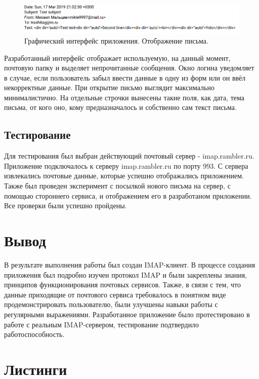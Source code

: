 \documentclass[a4paper,14pt]{extarticle}
\begin{document}
\begin{figure}[H]
	\begin{center}
		\includegraphics[scale=0.55]{pics/letter}
		\caption{Графический интерфейс приложения. Отображение письма.}
		\label{letter}
	\end{center}
\end{figure}

Разработанный интерфейс отображает используемую, на данный момент,
почтовую папку и выделяет непрочитанные сообщения.
Окно логина уведомляет в случае, если пользователь забыл ввести данные в одну из форм
или он ввёл некорректные данные. При открытие письмо выглядит максимально минималистично.
На отдельные строчки вынесены такие поля, как дата, тема письма, от кого оно, кому предназначалось и собственно сам текст письма.

\subsection{Тестирование}

Для тестирования был выбран действующий почтовый сервер - imap.rambler.ru. Приложение подключалось к серверу imap.rambler.ru по порту 993.
С сервера извлекались почтовые данные, которые успешно отображались приложением. Также был проведен эксперимент с посылкой нового письма
на сервер, с помощью стороннего сервиса, и отображением его в разработаном приложении. Все проверки были успешно пройдены.

\section{Вывод}

В результате выполнения работы был создан IMAP-клиент. 
В процессе создания приложения был подробно изучен протокол IMAP и были закреплены знания, принципов функционирования почтовых сервисов.
Также, в связи с тем, что данные приходящие от почтового сервиса требовалось в понятном виде продемонстрировать пользователю,
были улучшены навыки работы с регулярными выражениями.
Разработанное приложение было протестировано в работе с реальным IMAP-сервером, тестирование подтвердило работоспособность.

\newpage

\section{Листинги}

















\end{document}
